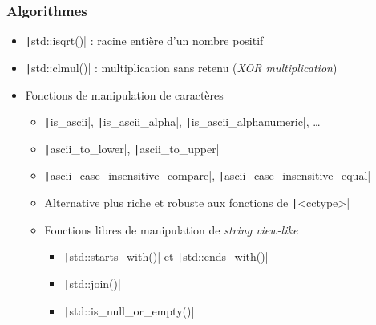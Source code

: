 \documentclass[C++.tex]{subfiles}
\begin{document}
\begin{frame}[fragile]
	\frametitle{Algorithmes}
	\begin{itemize}
		\item \texttt|std::isqrt()| : racine entière d'un nombre positif


		\item \texttt|std::clmul()| : multiplication sans retenu (\textit{XOR multiplication})
		\item Fonctions de manipulation de caractères
		\begin{itemize}
			\item \texttt|is_ascii|, \texttt|is_ascii_alpha|, \texttt|is_ascii_alphanumeric|, \ldots
			\item \texttt|ascii_to_lower|, \texttt|ascii_to_upper|
			\item \texttt|ascii_case_insensitive_compare|, \texttt|ascii_case_insensitive_equal|
			\item Alternative plus riche et robuste aux fonctions de \texttt|<cctype>|


			\item Fonctions libres de manipulation de \textit{string view-like}
			\begin{itemize}
				\item \texttt|std::starts_with()| et \texttt|std::ends_with()|
				\item \texttt|std::join()|
				\item \texttt|std::is_null_or_empty()|
			\end{itemize}
		\end{itemize}
	\end{itemize}

\end{frame}
\end{document}
